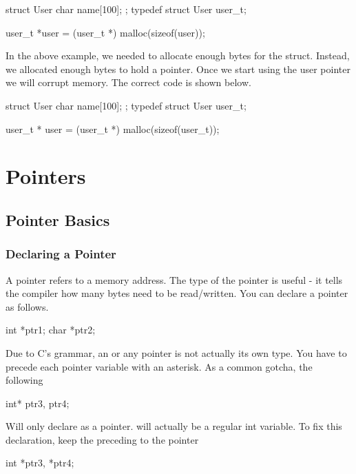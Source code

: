 \begin{code}[language=C]
struct User {
   char name[100];
};
typedef struct User user_t;

user_t *user = (user_t *) malloc(sizeof(user));
\end{code}

In the above example, we needed to allocate enough bytes for the struct.
Instead, we allocated enough bytes to hold a pointer. Once we start
using the user pointer we will corrupt memory. The correct code is shown
below.

\begin{code}[language=C]
struct User {
   char name[100];
};
typedef struct User user_t;

user_t * user = (user_t *) malloc(sizeof(user_t));
\end{code}


\section{Pointers}

\subsection{Pointer Basics}

\subsubsection{Declaring a Pointer}

A pointer refers to a memory address. The type of the pointer is useful
- it tells the compiler how many bytes need to be read/written. You can
declare a pointer as follows.

\begin{code}[language=C]
int *ptr1;
char *ptr2;
\end{code}

Due to C's grammar, an  or any pointer is not actually its
own type. You have to precede each pointer variable with an asterisk. As
a common gotcha, the following

\begin{code}[language=C]
int* ptr3, ptr4;
\end{code}

Will only declare  as a pointer.  will
actually be a regular int variable. To fix this declaration, keep the
\keyword{*} preceding to the pointer

\begin{code}[language=C]
int *ptr3, *ptr4;
\end{code}

